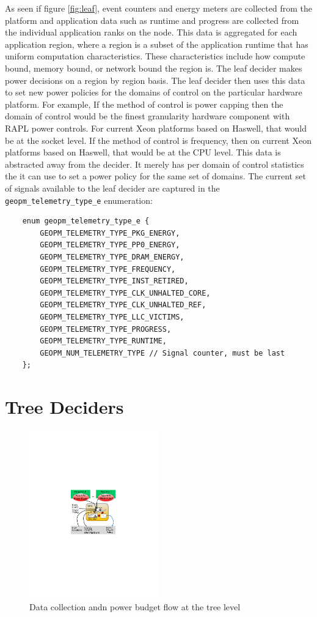 \documentclass[11pt]{article}
\begin{document}
As seen if figure \ref{fig:leaf}, event counters and energy meters are
collected from the platform and application data such as runtime and
progress are collected from the individual application ranks on the
node. This data is aggregated for each application region, where a
region is a subset of the application runtime that has uniform
computation characteristics. These characteristics include how compute
bound, memory bound, or network bound the region is. The leaf decider
makes power decisions on a region by region basis. The leaf decider
then uses this data to set new power policies for the domains of
control on the particular hardware platform. For example, If the
method of control is power capping then the domain of control would be
the finest granularity hardware component with RAPL power
controls. For current Xeon platforms based on Haswell, that would be
at the socket level. If the method of control is frequency, then on
current Xeon platforms based on Haswell, that would be at the CPU
level. This data is abstracted away from the decider. It merely has
per domain of control statistics the it can use to set a power policy
for the same set of domains. The current set of signals available to
the leaf decider are captured in the \verb#geopm_telemetry_type_e#
enumeration:

\begin{verbatim}
    enum geopm_telemetry_type_e {
        GEOPM_TELEMETRY_TYPE_PKG_ENERGY,
        GEOPM_TELEMETRY_TYPE_PP0_ENERGY,
        GEOPM_TELEMETRY_TYPE_DRAM_ENERGY,
        GEOPM_TELEMETRY_TYPE_FREQUENCY,
        GEOPM_TELEMETRY_TYPE_INST_RETIRED,
        GEOPM_TELEMETRY_TYPE_CLK_UNHALTED_CORE,
        GEOPM_TELEMETRY_TYPE_CLK_UNHALTED_REF,
        GEOPM_TELEMETRY_TYPE_LLC_VICTIMS,
        GEOPM_TELEMETRY_TYPE_PROGRESS,
        GEOPM_TELEMETRY_TYPE_RUNTIME,
        GEOPM_NUM_TELEMETRY_TYPE // Signal counter, must be last
    };
\end{verbatim}

\section{Tree Deciders}
\begin{figure} [H]
  \centering
  \includegraphics[width=0.5\textwidth]{tree-figure}
  \caption{Data collection andn power budget flow at the tree level}
  \label{fig:tree}
\end{figure}
\end{document}
